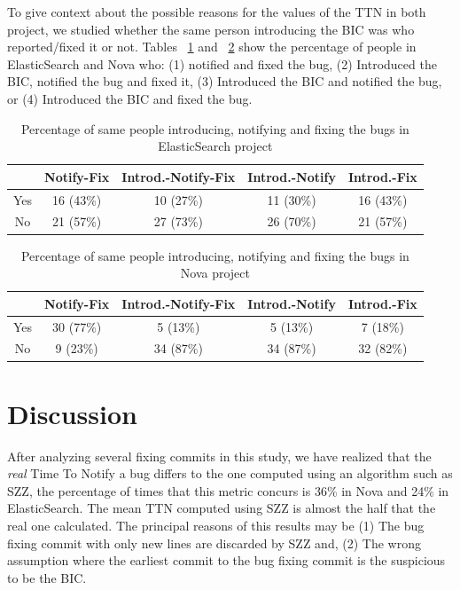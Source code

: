 \documentclass[10pt, conference]{IEEEtran}
\begin{document}
To give context about the possible reasons for the values of the TTN in both project, we studied whether the same person introducing the BIC was who reported/fixed it or not. Tables ~\ref{tableII} and ~\ref{tableIII} show the percentage of people in ElasticSearch and Nova who: (1) notified and fixed the bug, (2) Introduced the BIC, notified the bug and fixed it, (3) Introduced the BIC and notified the bug, or (4) Introduced the BIC and fixed the bug.
\begin{table}[!t]
\renewcommand{\arraystretch}{1.3}
\centering
\caption{Percentage of same people introducing, notifying and fixing the bugs in ElasticSearch project}
\label{tableII}
\begin{tabular}{|c||c||c||c||c| }
\hline
  & Notify-Fix & Introd.-Notify-Fix & Introd.-Notify & Introd.-Fix \\
\hline
Yes & 16 (43\%) & 10 (27\%) & 11 (30\%) & 16 (43\%) \\
\hline
No & 21 (57\%) & 27 (73\%) & 26 (70\%) & 21 (57\%) \\
\hline
\end{tabular}
\end{table}

\begin{table}[!t]
\renewcommand{\arraystretch}{1.3}
\centering
\caption{Percentage of same people introducing, notifying and fixing the bugs in Nova project}
\label{tableIII}
\begin{tabular}{|c||c||c||c||c| }
\hline
  & Notify-Fix & Introd.-Notify-Fix & Introd.-Notify & Introd.-Fix \\
\hline
Yes & 30 (77\%) & 5 (13\%) & 5 (13\%) & 7 (18\%) \\
\hline
No & 9 (23\%) & 34 (87\%) & 34 (87\%) & 32 (82\%) \\
\hline
\end{tabular}
\end{table}
\section{Discussion}
\label{sec:discussion}

After analyzing several fixing commits in this study, we have realized that the \emph{real} Time To Notify a bug differs to the one computed using an algorithm such as SZZ, the percentage of times that this metric concurs is 36\% in Nova and 24\% in ElasticSearch. The mean TTN computed using SZZ is almost the half that the real one calculated. The principal reasons of this results may be (1) The bug fixing commit with only new lines are discarded by SZZ and, (2) The wrong assumption where the earliest commit to the bug fixing commit is the suspicious to be the BIC.
\end{document}
